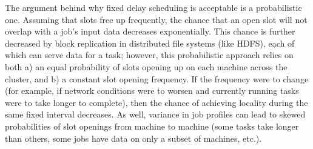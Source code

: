 The argument behind why fixed delay scheduling is acceptable is a probabilistic one. Assuming 
that slots free up frequently, the chance that an open slot will not overlap with a job's 
input data decreases exponentially. This chance is further decreased by block replication 
in distributed file systems (like HDFS), each of which can serve data for a task; however,
this probabilistic approach relies on both a) an equal probability of slots opening up on each machine across
the cluster, and b) a constant slot opening frequency. If the frequency were to change (for
example, if network conditions were to worsen and currently running tasks were to take longer to complete), 
then the chance of achieving locality during the same fixed interval decreases. As well,
variance in job profiles can lead to skewed probabilities of slot openings from machine
to machine (some tasks take
longer than others, some jobs have data on only a subset of machines, etc.). 



